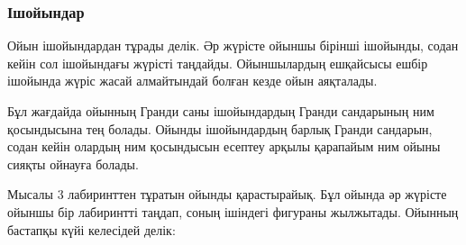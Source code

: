 
\subsubsection{Ішойындар}

Ойын ішойындардан тұрады делік. Әр жүрісте
ойыншы бірінші ішойынды, содан кейін сол ішойындағы жүрісті таңдайды. 
Ойыншылардың ешқайсысы ешбір ішойында жүріс жасай алмайтындай болған кезде ойын аяқталады.


Бұл жағдайда ойынның Гранди саны ішойындардың
Гранди сандарының ним қосындысына тең болады. Ойынды ішойындардың барлық Гранди сандарын, содан кейін олардың ним қосындысын есептеу арқылы қарапайым
ним ойыны сияқты ойнауға болады. 


Мысалы 3 лабиринттен тұратын ойынды қарастырайық. 
Бұл ойында әр жүрісте ойыншы бір лабиринтті таңдап,
соның ішіндегі фигураны жылжытады. Ойынның бастапқы күйі
келесідей делік:


